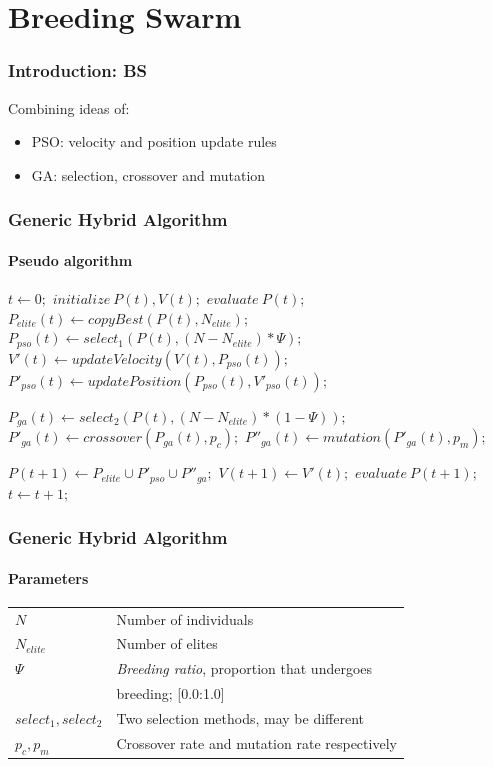 \documentclass{beamer}
\begin{document}
\section{Breeding Swarm}
\begin{frame}[fragile]
  \frametitle{Introduction: BS}
  Combining ideas of:
  \begin{itemize}
    \item PSO: velocity and position update rules
    \item GA: selection, crossover and mutation
  \end{itemize}
  
\end{frame}
\begin{frame}[fragile]
  \frametitle{Generic Hybrid Algorithm}
  \framesubtitle{Pseudo algorithm}
  \begin{algorithmic}
    \STATE $t \gets 0;$
    \STATE $initialize\: P(t), V(t);$
    \STATE $evaluate\: P(t);$
    \REPEAT
      \STATE $P_{elite}(t) \gets copyBest(P(t), N_{elite});$
      \STATE $P_{pso}(t) \gets select_1(P(t), (N - N_{elite}) * \Psi);$
      \STATE $V'(t) \gets updateVelocity(V(t), P_{pso}(t));$
      \STATE $P'_{pso}(t) \gets updatePosition(P_{pso}(t), V'_{pso}(t));$
      
      \STATE $P_{ga}(t) \gets select_2(P(t), (N - N_{elite}) * (1-\Psi));$
      \STATE $P'_{ga}(t) \gets crossover(P_{ga}(t), p_c);$
      \STATE $P''_{ga}(t) \gets mutation(P'_{ga}(t), p_m);$
      
      \STATE $P(t+1) \gets P_{elite} \cup P'_{pso} \cup P''_{ga};$
      \STATE $V(t+1) \gets V'(t);$
      \STATE $evaluate\: P(t+1);$
      \STATE $t \gets t + 1;$
  \end{algorithmic}
\end{frame}
\begin{frame}
  \frametitle{Generic Hybrid Algorithm}
  \framesubtitle{Parameters}
  \begin{tabular}{ll}
  $ N $ & Number of individuals \\
  $ N_{elite} $ & Number of elites \\
  $ \Psi $ & \emph{Breeding ratio}, proportion that undergoes \\
  & breeding; [0.0:1.0]\\
  $ select_1, select_2 $ & Two selection methods, may be different\\
  $ p_c, p_m $ & Crossover rate and mutation rate respectively \\
  \end{tabular}
  \bigskip
  
\end{frame}
\end{document}
